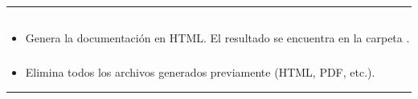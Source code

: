 \documentclass[a4paper,10pt,spanish]{sphinxmanual}
\begin{document}
\bigskip\hrule\bigskip



\subsection{}
\label{\detokenize{comandos_mas_usados/comandos:generacion-de-documentacion}}

\subsubsection{}
\label{\detokenize{comandos_mas_usados/comandos:para-generar-documentacion-en-formato-html}}
\begin{sphinxVerbatim}[commandchars=\\\{\}]
 
\end{sphinxVerbatim}
\begin{itemize}
\item {} 
\sphinxAtStartPar
Genera la documentación en HTML. El resultado se encuentra en la carpeta .

\end{itemize}


\subsubsection{}
\label{\detokenize{comandos_mas_usados/comandos:para-limpiar-los-archivos-generados}}
\begin{sphinxVerbatim}[commandchars=\\\{\}]
 
\end{sphinxVerbatim}
\begin{itemize}
\item {} 
\sphinxAtStartPar
Elimina todos los archivos generados previamente (HTML, PDF, etc.).

\end{itemize}


\bigskip\hrule\bigskip



\subsubsection{}
\label{\detokenize{comandos_mas_usados/comandos:actualizar-dependencias}}
\begin{sphinxVerbatim}[commandchars=\\\{\}]
    
\end{sphinxVerbatim}
\end{document}
